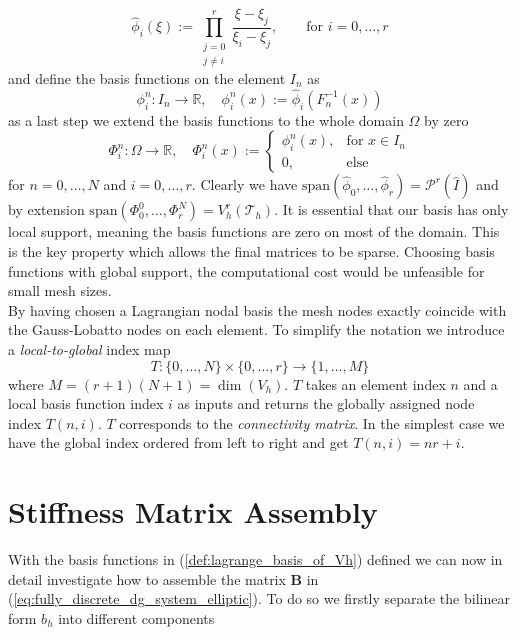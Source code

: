 \begin{equation}
	\label{def:lagrange_ref_basis}
	\widehat{\phi}_i(\xi) := \prod_{\substack{j = 0 \\ j\neq i}}^{r}\frac{\xi - \xi_j}{\xi_i - \xi_j},
	\qquad \text{for } i=0,\ldots,r
\end{equation}
and define the basis functions on the element $I_n$ as
\begin{equation}
	\phi^n_i : I_n \to \mathbb{R}, \quad \phi^n_i(x) := \widehat{\phi}_i(F_n^{-1}(x))
	\nonumber
\end{equation}
as a last step we extend the basis functions to the whole domain $\Omega$ by zero
\begin{equation}
	\Phi_i^n: \Omega \to \mathbb{R}, \quad \Phi_i^n(x) :=
	\begin{cases}
		\phi_i^n(x), & \text{for } x\in I_n \\
		0,           & \text{else}
	\end{cases}
	\label{def:lagrange_basis_of_Vh}
\end{equation}
for $n=0,\ldots,N$ and $i=0,\ldots,r$. Clearly we have $\text{span}( \widehat{\phi}_0, \ldots, \widehat{\phi}_r) = \mathcal{P}^r(\hat{I})$
and by extension $\text{span}(\Phi_0^0,\ldots,\Phi_r^N) = V_h^r(\mathcal{T}_h)$. It is essential
that our basis has only local support, meaning the basis functions are zero on most of the domain. This is the key property which
allows the final matrices to be sparse. Choosing basis functions with global support, the computational cost would be unfeasible for
small mesh sizes. \\
By having chosen a Lagrangian nodal basis the mesh nodes exactly coincide with the Gauss-Lobatto nodes on each
element.
To simplify the notation we introduce a \textit{local-to-global} index map
\begin{equation}
	\label{def:local_to_global_map}
	T: \{0,\ldots,N\} \times \{0,\ldots,r\} \to \{1,\ldots,M\}
\end{equation}
where $M = (r+1)(N+1) = \dim(V_h)$. $T$ takes an element index $n$ and a local basis function index $i$ as inputs
and returns the globally assigned node index $T(n,i)$. $T$ corresponds to the
\textit{connectivity matrix}. In the simplest case we have the global index ordered from left to right and get
$T(n,i) = nr + i$.


\section{Stiffness Matrix Assembly}
\label{sec:stiff_assembly}
With the basis functions in (\ref{def:lagrange_basis_of_Vh}) defined we can now in detail investigate how
to assemble the matrix $\textbf{B}$ in (\ref{eq:fully_discrete_dg_system_elliptic}). To do so we firstly separate
the bilinear form $b_h$ into different components

